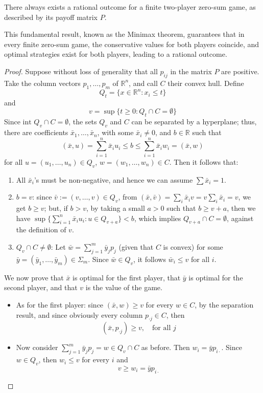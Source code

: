 \begin{theorem}
    There always exists a rational outcome for a finite two-player zero-sum game, as described by its payoff matrix $P$.
\end{theorem}
This fundamental result, known as the Minimax theorem, guarantees that in every finite zero-sum game, the conservative values for both players coincide, and optimal strategies exist for both players, leading to a rational outcome.
\begin{proof}
    Suppose without loss of generality that all $p_{ij}$ in the matrix $P$ are positive. 
    Take the column vectors $p_1, \dots, p_m$ of $\mathbb{R}^n$, and call $C$ their convex hull. 
    Define 
    \[Q_t = \{x \in \mathbb{R}^n : x_i \leq t \}\]
    and 
    \[v = \sup \{t \geq 0 : Q_t \cap C = \emptyset\}\]
    Since $\text{int } Q_v \cap C = \emptyset$, the sets $Q_v$ and $C$ can be separated by a hyperplane; thus, there are coefficients $\bar{x}_1, \dots, \bar{x}_n$, with some $\bar{x}_i \neq 0$, and $b \in \mathbb{R}$ such that
    \[(\bar{x}, u) = \sum_{i=1}^{n} \bar{x}_i u_i \leq b \leq \sum_{i=1}^{n} \bar{x}_i w_i = (\bar{x}, w)\]
    for all $u = (u_1, \dots, u_n) \in Q_v$, $w = (w_1, \dots, w_n) \in C$. 
    Then it follows that:
    \begin{enumerate}
        \item All $\bar{x}_i$'s must be non-negative, and hence we can assume $\sum \bar{x}_i = 1$.
        \item $b = v$: since $\bar{v} := (v, \dots, v) \in Q_v$, from $(\bar{x}, \bar{v}) = \sum_i \bar{x}_i v = v \sum_i \bar{x}_i = v$, we get $b \geq v$; but, if $b > v$, by taking a small $a > 0$ such that $b \geq v + a$, then we have $\sup \{\sum_{i=1}^{n} \bar{x}_i u_i : u \in Q_{v + a} \} < b$, which implies $Q_{v + a} \cap C = \emptyset$, against the definition of $v$.
        \item $Q_v \cap C \neq \emptyset$: Let $\bar{w} = \sum_{j=1}^{m} \bar{y}_j p_j$ (given that $C$ is convex) for some $\bar{y} = (\bar{y}_1, \dots, \bar{y}_m) \in \Sigma_m$. Since $\bar{w} \in Q_v$, it follows $\bar{w}_i \leq v$ for all $i$.
    \end{enumerate}
    We now prove that $\bar{x}$ is optimal for the first player, that $\bar{y}$ is optimal for the second player, and that $v$ is the value of the game.
    \begin{itemize}
        \item As for the first player: since $(\bar{x}, w) \geq v$ for every $w \in C$, by the separation result, and since obviously every column $p_{\cdot j} \in C$, then
            \[(\bar{x}, p_{\cdot j}) \geq v, \quad \text{for all } j\]
        \item Now consider $\sum_{j=1}^{m} \bar{y}_j p_j = w \in Q_v \cap C$ as before. 
            Then $w_i = \bar{y} p_{i \cdot}$. Since $w \in Q_v$, then $w_i \leq v$ for every $i$ and
            \[v \geq w_i = \bar{y} p_{i \cdot}\]
    \end{itemize}
\end{proof}